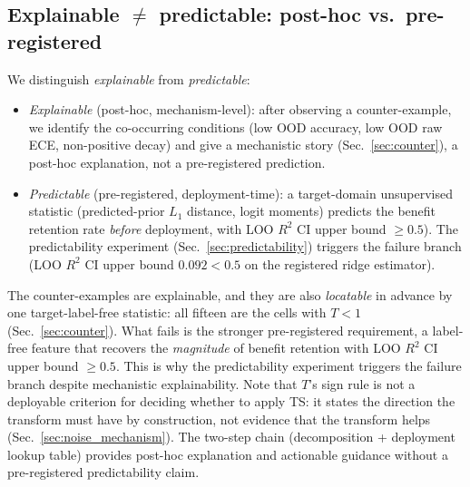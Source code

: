 \documentclass[review,12pt,nonatbib]{elsarticle}
\begin{document}
\subsection{Explainable $\neq$ predictable: post-hoc vs.\ pre-registered}
We distinguish \emph{explainable} from \emph{predictable}:
\begin{itemize}
    \item \emph{Explainable} (post-hoc, mechanism-level): after
    observing a counter-example, we identify the co-occurring
    conditions (low OOD accuracy, low OOD raw ECE, non-positive
    decay) and give a mechanistic story (Sec.~\ref{sec:counter}), a
    post-hoc explanation, not a pre-registered prediction.
    \item \emph{Predictable} (pre-registered, deployment-time): a
    target-domain unsupervised statistic (predicted-prior $L_1$
    distance, logit moments) predicts the benefit retention rate
    \emph{before} deployment, with LOO $R^2$ CI upper bound
    $\geq 0.5$). The predictability experiment
    (Sec.~\ref{sec:predictability}) triggers the failure branch
    (LOO $R^2$ CI upper bound $0.092 < 0.5$ on the registered ridge
    estimator).
\end{itemize}
The counter-examples are explainable, and they are also \emph{locatable}
in advance by one target-label-free statistic: all fifteen are the cells
with $T<1$ (Sec.~\ref{sec:counter}). What fails is the stronger
pre-registered requirement, a label-free feature that recovers the
\emph{magnitude} of benefit retention with LOO $R^2$ CI upper bound
$\geq 0.5$. This is why the predictability experiment triggers the
failure branch despite mechanistic explainability. Note that $T$'s sign
rule is not a deployable criterion for deciding whether to apply TS: it
states the direction the transform must have by construction, not
evidence that the transform helps (Sec.~\ref{sec:noise_mechanism}). The
two-step chain (decomposition + deployment
lookup table) provides post-hoc explanation and actionable guidance
without a pre-registered predictability claim.

\end{document}
